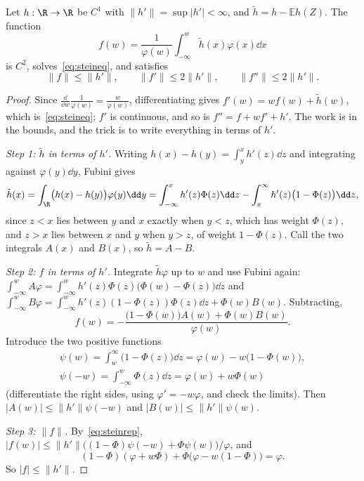 \begin{lemma}\label{lem:steinsol}
Let $h:\R\to\R$ be $C^1$ with $\|h'\|=\sup|h'|<\infty$, and $\tilde h=h-\mathbb Eh(Z)$. The function
\[
f(w)=\frac1{\varphi(w)}\int_{-\infty}^w\tilde h(x)\varphi(x)\dd x
\]
is $C^2$, solves~\eqref{eq:steineq}, and satisfies
\[
\|f\|\le\|h'\|,\qquad\|f'\|\le2\|h'\|,\qquad\|f''\|\le2\|h'\|.
\]
\end{lemma}
\begin{proof}
Since $\frac{\dd}{\dd w}\frac1{\varphi(w)}=\frac w{\varphi(w)}$, differentiating gives $f'(w)=wf(w)+\tilde h(w)$, which is~\eqref{eq:steineq}; $f'$ is continuous,
and so is $f''=f+wf'+h'$. The work is in the bounds, and the trick is to write everything in terms of $h'$.

\emph{Step 1: $\tilde h$ in terms of $h'$.} Writing $h(x)-h(y)=\int_y^xh'(z)\dd z$ and integrating against $\varphi(y)\dd y$, Fubini gives
\[
\tilde h(x)=\int_{\R}\bigl(h(x)-h(y)\bigr)\varphi(y)\dd y=\int_{-\infty}^xh'(z)\Phi(z)\dd z-\int_x^\infty h'(z)\bigl(1-\Phi(z)\bigr)\dd z,
\]
since $z<x$ lies between $y$ and $x$ exactly when $y<z$, which has weight $\Phi(z)$, and $z>x$ lies between $x$ and $y$ when $y>z$, of weight $1-\Phi(z)$.
Call the two integrals $A(x)$ and $B(x)$, so $\tilde h=A-B$.

\emph{Step 2: $f$ in terms of $h'$.} Integrate $\tilde h\varphi$ up to $w$ and use Fubini again: $\int_{-\infty}^wA\varphi=\int_{-\infty}^wh'(z)\Phi(z)\bigl(\Phi(w)-\Phi(z)\bigr)\dd z$
and $\int_{-\infty}^wB\varphi=\int_{-\infty}^wh'(z)(1-\Phi(z))\Phi(z)\dd z+\Phi(w)B(w)$. Subtracting,
\begin{equation}\label{eq:steinrep}
f(w)=-\frac{\bigl(1-\Phi(w)\bigr)A(w)+\Phi(w)B(w)}{\varphi(w)}.
\end{equation}
Introduce the two positive functions
\[
\begin{gathered}
\psi(w)=\int_w^\infty\bigl(1-\Phi(z)\bigr)\dd z=\varphi(w)-w\bigl(1-\Phi(w)\bigr),\\\psi(-w)=\int_{-\infty}^w\Phi(z)\dd z=\varphi(w)+w\Phi(w)
\end{gathered}
\]
(differentiate the right sides, using $\varphi'=-w\varphi$, and check the limits). Then $|A(w)|\le\|h'\|\psi(-w)$ and $|B(w)|\le\|h'\|\psi(w)$.

\emph{Step 3: $\|f\|$.} By~\eqref{eq:steinrep}, $|f(w)|\le\|h'\|\bigl((1-\Phi)\psi(-w)+\Phi\psi(w)\bigr)/\varphi$, and
\[
(1-\Phi)(\varphi+w\Phi)+\Phi\bigl(\varphi-w(1-\Phi)\bigr)=\varphi.
\]
So $|f|\le\|h'\|$.


\end{proof}
